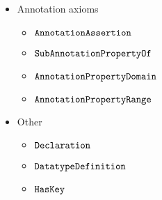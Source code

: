 \documentclass[paper.tex]{subfiles}
\begin{document}
\begin{itemize}
  \item Annotation axioms
  \begin{itemize}[noitemsep]
    \item $\mathtt{AnnotationAssertion}$
    \item $\mathtt{SubAnnotationPropertyOf}$
    \item $\mathtt{AnnotationPropertyDomain}$
    \item $\mathtt{AnnotationPropertyRange}$
  \end{itemize}

  \item Other
  \begin{itemize}[noitemsep]
    \item $\mathtt{Declaration}$
    \item $\mathtt{DatatypeDefinition}$
    \item $\mathtt{HasKey}$
  \end{itemize}
\end{itemize}
\end{document}
